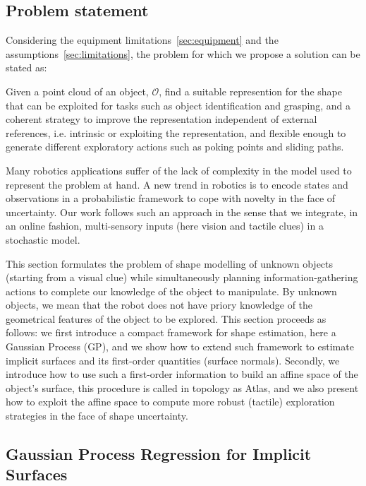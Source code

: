 \subsection{Problem statement}
\label{sec:problem}

Considering the equipment limitations~\ref{sec:equipment} and the assumptions~\ref{sec:limitations}, the problem for which we propose a solution can be stated as:

Given a point cloud of an object, $\mathcal{O}$, find a suitable represention for the shape that can be exploited for tasks such as object identification and grasping, and a coherent strategy to improve the representation independent of external references, i.e. intrinsic or exploiting the representation, and flexible enough to generate different exploratory actions such as poking points and sliding paths.

Many robotics applications suffer of the lack of complexity in the model used to represent the problem at hand. A new trend in robotics is to encode states and observations in a probabilistic framework to cope with novelty in the face of uncertainty. Our work follows such an approach in the sense that we integrate, in an online fashion, multi-sensory inputs (here vision and tactile clues) in a stochastic model.

This section formulates the problem of shape modelling of unknown objects (starting from a visual clue) while simultaneously planning information-gathering actions to complete our knowledge of the object to manipulate. By unknown objects, we mean that the robot does not have priory knowledge of the geometrical features of the object to be explored.  This section proceeds as follows: we first introduce a compact framework for shape estimation, here a Gaussian Process (GP), and we show how to extend such framework to estimate implicit surfaces and its first-order quantities (surface normals). Secondly, we introduce how to use such a first-order information to build an affine space of the object's surface, this procedure is called in topology as Atlas, and we also present how to exploit the affine space to compute more robust (tactile) exploration strategies in the face of shape uncertainty. 

\subsection{Gaussian Process Regression for Implicit Surfaces}
\label{sec:gpr}

